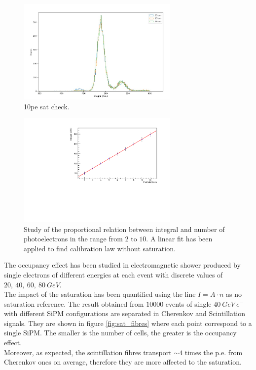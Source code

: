 \begin{figure}
	\centering
	\includegraphics[width=0.7\textwidth]{IMG/10pe_sat_check}
	\caption{10pe sat check.}
	\label{fig:SatCheck}
\end{figure}

\begin{figure}
	\centering
	\includegraphics[width=0.7\textwidth]{IMG/Cap5/NoSatLine}
	\caption{Study of the proportional relation between integral and number of photoelectrons in the range from $2$ to $10$. A linear fit has been applied to find calibration law without saturation.}
	\label{fig:NoSatLine}
\end{figure}

The occupancy effect has been studied in electromagnetic shower produced by single electrons of different energies at each event with discrete values of $20,\ 40,\ 60,\ 80\ GeV$.\\
The impact of the saturation has been quantified using the line $I = A\cdot n$ as no saturation reference. The result obtained from $10000$ events of single $40\ GeV\ e^-$ with different SiPM configurations are separated in Cherenkov and Scintillation signals. They are shown in figure \ref{fig:sat_fibres} where each point correspond to a single SiPM. The smaller is the number of cells, the greater is the occupancy effect.\\
Moreover, as expected, the scintillation fibres transport $\sim 4$ times the p.e. from Cherenkov ones on average, therefore they are more affected to the saturation.\\

